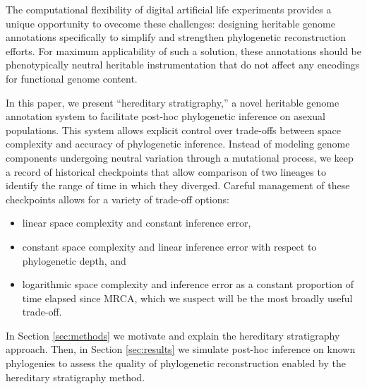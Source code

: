 The computational flexibility of digital artificial life experiments provides a unique opportunity to ovecome these challenges: designing heritable genome annotations specifically to simplify and strengthen phylogenetic reconstruction efforts.
For maximum applicability of such a solution, these annotations should be phenotypically neutral heritable instrumentation \citep{stanley2002evolving} that do not affect any encodings for functional genome content.

In this paper, we present ``hereditary stratigraphy,'' a novel heritable genome annotation system to facilitate post-hoc phylogenetic inference on asexual populations.
This system allows explicit control over trade-offs between space complexity and accuracy of phylogenetic inference.
Instead of modeling genome components undergoing neutral variation through a mutational process, we keep a record of historical checkpoints that allow comparison of two lineages to identify the range of time in which they diverged.
Careful management of these checkpoints allows for a variety of trade-off options:
\begin{itemize}
  \item linear space complexity and constant inference error,
  \item constant space complexity and linear inference error with respect to phylogenetic depth, and
  \item logarithmic space complexity and inference error as a constant proportion of time elapsed since MRCA, which we suspect will be the most broadly useful trade-off.
\end{itemize}

In Section \ref{sec:methods} we motivate and explain the hereditary stratigraphy approach.
Then, in Section \ref{sec:results} we simulate post-hoc inference on known phylogenies to assess the quality of phylogenetic reconstruction enabled by the hereditary stratigraphy method.
